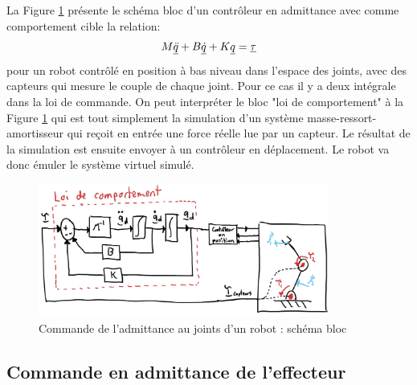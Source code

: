 La Figure \ref{fig:admitancecontroljointspace} présente le schéma bloc d'un contrôleur en admittance avec comme comportement cible la relation:
\begin{align}
M \underline{\ddot{q}} + B \underline{\dot{q}} + K \underline{q} = \underline{\tau}
\end{align}
pour un robot contrôlé en position à bas niveau dans l'espace des joints, avec des capteurs qui mesure le couple de chaque joint. Pour ce cas il y a deux intégrale dans la loi de commande. On peut interpréter le bloc "loi de comportement" à la Figure \ref{fig:admitancecontroljointspace} qui est tout simplement la simulation d'un système masse-ressort-amortisseur qui reçoit en entrée une force réelle lue par un capteur. Le résultat de la simulation est ensuite envoyer à un contrôleur en déplacement. Le robot va donc émuler le système virtuel simulé. 
\begin{figure}[h]
	\centering
		\includegraphics[width=0.85\textwidth]{fig/admitancecontroljointspace.jpg}
	\caption{Commande de l'admittance au joints d'un robot : schéma bloc}
	\label{fig:admitancecontroljointspace}
\end{figure}


\subsection{Commande en admittance de l'effecteur}
\label{sec:effadmcontrol}

